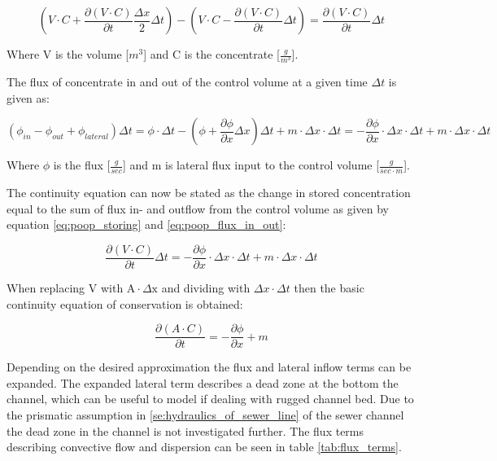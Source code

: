 \begin{equation}
 \left(V \cdot C + \frac{\partial (V\cdot C)}{\partial t} \frac{\Delta x}{2} \Delta t \right) - \left(V \cdot C - \frac{\partial (V\cdot C)}{\partial t} \Delta t \right) = \frac{\partial (V\cdot C)}{\partial t}\Delta t
\label{eq:poop_storing}
\end{equation}

Where V is the volume [$m^3$] and C is the concentrate [$\frac{g}{m^3}$]. 

The flux of concentrate in and out of the control volume at a given time $\Delta t$ is given as:


 \begin{equation}
  	\left( \phi_{in} - \phi_{out} + \phi_{lateral} \right) \Delta t   =	\phi \cdot \Delta t - \left(\phi + \frac{\partial \phi}{\partial x}\Delta x \right) \Delta t + m \cdot \Delta x \cdot \Delta t = - \frac{\partial \phi}{\partial x}\cdot \Delta x \cdot \Delta t +m \cdot \Delta x \cdot \Delta t  
  \label{eq:poop_flux_in_out}
  \end{equation} 



Where $\phi$ is the flux [$\frac{g}{sec}$] and m is lateral flux input to the control volume [$\frac{g}{sec\cdot m}$].

The continuity equation can now be stated as the change in stored concentration equal to the sum of flux in- and outflow from the control volume as given by equation \ref{eq:poop_storing} and \ref{eq:poop_flux_in_out}:

\begin{equation}
	\frac{\partial (V\cdot C)}{\partial t}\Delta t = - \frac{\partial \phi}{\partial x}\cdot \Delta x \cdot \Delta t +m \cdot \Delta x \cdot \Delta t
\end{equation}

When replacing V with $\text{A}\cdot \Delta \text{x}$ and dividing with $\Delta x \cdot  \Delta t$ then the basic continuity equation of conservation is obtained:

\begin{equation}
	\frac{\partial (A\cdot C)}{\partial t} = - \frac{\partial \phi}{\partial x} + m 
\label{eq:concentrate_continuity_equation}
\end{equation}

Depending on the desired approximation the flux and lateral inflow terms can be expanded. The expanded lateral term describes a dead zone at the bottom the channel, which can be useful to model if dealing with rugged channel bed. Due to the prismatic assumption in \ref{se:hydraulics_of_sewer_line} of the sewer channel the dead zone in the channel is not investigated further. The flux terms describing convective flow and dispersion can be seen in table \ref{tab:flux_terms}.  

